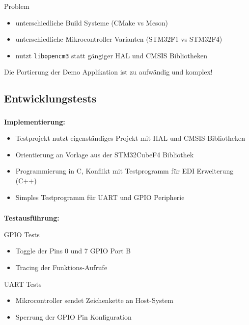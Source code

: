 \begin{frame}[fragile]
\frametitle{\insertsection}
\framesubtitle{\insertsubsection}

\begin{alertblock}{Problem}
\begin{itemize}
    \item unterschiedliche Build Systeme (CMake vs Meson)
    \item unterschiedliche Mikrocontroller Varianten (STM32F1 vs STM32F4)
    \item nutzt \texttt{libopencm3} statt gängiger HAL und CMSIS
        Bibliotheken\cite{YJDefinitiveGuide}
\end{itemize}
\end{alertblock}
\vspace{5mm}
\hspace{5mm}\textbf{\rightarrow}\hspace{5mm} Die Portierung der Demo
    Applikation ist zu aufwändig und komplex!
\end{frame}

\subsection{Entwicklungstests}

\begin{frame}[fragile]
\frametitle{\insertsection}
\framesubtitle{\insertsubsection}

\textbf{Implementierung:}
\begin{itemize}
    \item Testprojekt nutzt eigenständiges Projekt mit HAL und CMSIS
        Bibliotheken
    \item Orientierung an Vorlage aus der STM32CubeF4 Bibliothek
    \item Programmierung in C, Konflikt mit Testprogramm für EDI Erweiterung
        (C++)
    \item Simples Testprogramm für UART und GPIO Peripherie
\end{itemize}
\end{frame}

\begin{frame}[fragile]
\frametitle{\insertsection}
\framesubtitle{\insertsubsection}

\textbf{Testausführung:}
\begin{block}{GPIO Tests}
    \begin{itemize}
        \item Toggle der Pins 0 und 7 GPIO Port B
        \item Tracing der Funktions-Aufrufe
    \end{itemize}
\end{block}

\begin{block}{UART Tests}
    \begin{itemize}
        \item Mikrocontroller sendet Zeichenkette an Host-System
        \item Sperrung der GPIO Pin Konfiguration
    \end{itemize}
\end{block}

\end{frame}
